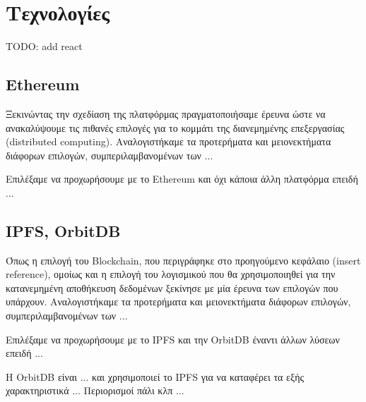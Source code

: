 \section{Τεχνολογίες} \label{section:3-5-technologies}

TODO: add react

\subsection{Ethereum}

Ξεκινώντας την σχεδίαση της πλατφόρμας πραγματοποιήσαμε έρευνα ώστε να ανακαλύψουμε τις πιθανές επιλογές για το κομμάτι της διανεμημένης επεξεργασίας (\textenglish{distributed computing}). Αναλογιστήκαμε τα προτερήματα και μειονεκτήματα διάφορων επιλογών, συμπεριλαμβανομένων των ... 

Επιλέξαμε να προχωρήσουμε με το Ethereum και όχι κάποια άλλη πλατφόρμα επειδή ...


\subsection{IPFS, OrbitDB}

Όπως η επιλογή του Blockchain, που περιγράφηκε στο προηγούμενο κεφάλαιο (\textenglish{insert reference}), ομοίως και η επιλογή του λογισμικού που θα χρησιμοποιηθεί για την κατανεμημένη αποθήκευση δεδομένων ξεκίνησε με μία έρευνα των επιλογών που υπάρχουν. Αναλογιστήκαμε τα προτερήματα και μειονεκτήματα διάφορων επιλογών, συμπεριλαμβανομένων των ... 

Επιλέξαμε να προχωρήσουμε με το IPFS και την OrbitDB έναντι άλλων λύσεων επειδή ...

Η OrbitDB είναι ... και χρησιμοποιεί το IPFS για να καταφέρει τα εξής χαρακτηριστικά ...
Περιορισμοί πάλι κλπ ...
